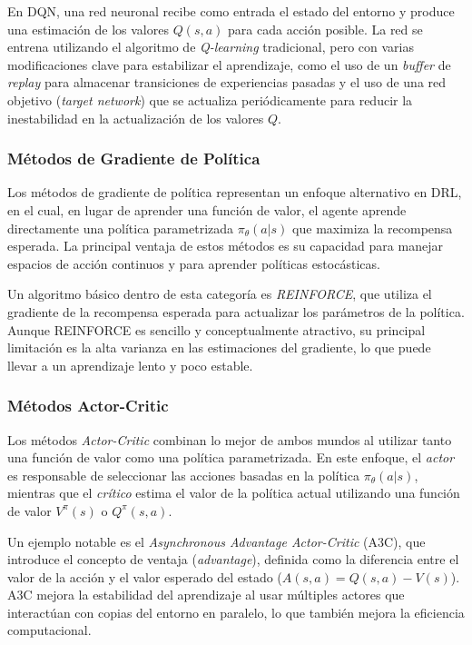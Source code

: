 \documentclass[a4paper,12pt]{report}
\begin{document}
En DQN, una red neuronal recibe como entrada el estado del entorno y produce una estimación 
de los valores \(Q(s, a)\) para cada acción posible. La red se entrena utilizando el 
algoritmo de \textit{Q-learning} tradicional, pero con varias modificaciones clave para 
estabilizar el aprendizaje, como el uso de un \textit{buffer} de \textit{replay} para 
almacenar transiciones de experiencias pasadas y el uso de una red objetivo 
(\textit{target network}) que se actualiza periódicamente para reducir la inestabilidad 
en la actualización de los valores \(Q\).

\subsubsection{Métodos de Gradiente de Política}

Los métodos de gradiente de política representan un enfoque alternativo en DRL, en el cual, 
en lugar de aprender una función de valor, el agente aprende directamente una política 
parametrizada \(\pi_{\theta}(a|s)\) que maximiza la recompensa esperada. La principal 
ventaja de estos métodos es su capacidad para manejar espacios de acción continuos y 
para aprender políticas estocásticas.

Un algoritmo básico dentro de esta categoría es \textit{REINFORCE}, que utiliza el gradiente 
de la recompensa esperada para actualizar los parámetros de la política. Aunque REINFORCE es 
sencillo y conceptualmente atractivo, su principal limitación es la alta varianza en las 
estimaciones del gradiente, lo que puede llevar a un aprendizaje lento y poco estable.

\subsubsection{Métodos Actor-Critic}

Los métodos \textit{Actor-Critic} combinan lo mejor de ambos mundos al utilizar tanto una 
función de valor como una política parametrizada. En este enfoque, el \textit{actor} es 
responsable de seleccionar las acciones basadas en la política \(\pi_{\theta}(a|s)\), mientras 
que el \textit{crítico} estima el valor de la política actual utilizando una función de valor 
\(V^{\pi}(s)\) o \(Q^{\pi}(s, a)\).

Un ejemplo notable es el \textit{Asynchronous Advantage Actor-Critic} (A3C), que introduce 
el concepto de ventaja (\textit{advantage}), definida como la diferencia entre el valor de 
la acción y el valor esperado del estado (\(A(s, a) = Q(s, a) - V(s)\)). A3C mejora la 
estabilidad del aprendizaje al usar múltiples actores que interactúan con copias del entorno 
en paralelo, lo que también mejora la eficiencia computacional.
\end{document}
